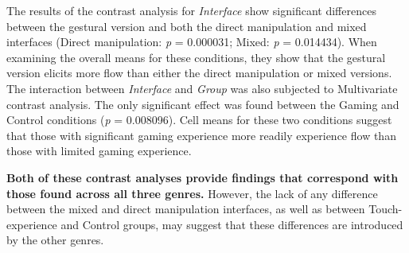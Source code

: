 The results of the contrast analysis for \emph{Interface} show significant differences between the gestural version and both the direct manipulation and mixed interfaces (Direct manipulation: \emph{p} = 0.000031; Mixed: \emph{p} = 0.014434). When examining the overall means for these conditions, they show that the gestural version elicits more flow than either the direct manipulation or mixed versions. The interaction between \emph{Interface} and \emph{Group} was also subjected to Multivariate contrast analysis. The only significant effect was found between the Gaming and Control conditions (\emph{p} = 0.008096). Cell means for these two conditions suggest that those with significant gaming experience more readily experience flow than those with limited gaming experience. 

{\bf Both of these contrast analyses provide findings that correspond with those found across all three genres.} However, the lack of any difference between the mixed and direct manipulation interfaces, as well as between Touch-experience and Control groups, may suggest that these differences are introduced by the other genres.
